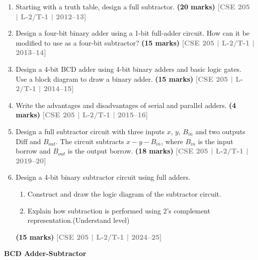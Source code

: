 \documentclass[12pt,a4paper]{article}
\newcommand{\yr}[1]{\hfill\textcolor{gray}{\small\textbf{[#1]}}}
\newcommand{\mk}[1]{\textcolor{orange!70!black}{\small\textbf{(#1 marks)}}}
\newcommand{\subtopic}[2]{%
  \vspace{10pt}
  \noindent\begin{tcolorbox}[colback=#1!8,colframe=#1,boxrule=0.6pt,arc=4pt,
    left=6pt,right=6pt,top=4pt,bottom=4pt]
    \small\bfseries\textcolor{#1}{#2}
  \end{tcolorbox}
  \vspace{2pt}
}
\begin{document}
\begin{enumerate}

\item Starting with a truth table, design a full subtractor.
\mk{20} \yr{CSE 205 | L-2/T-1 | 2012--13}

\item Design a four-bit binary adder using a 1-bit full-adder circuit. How can it be modified to use as a four-bit subtractor?
\mk{15} \yr{CSE 205 | L-2/T-1 | 2013--14}


\item Design a 4-bit BCD adder using 4-bit binary adders and basic logic gates. Use a block diagram to draw a binary adder.
\mk{15} \yr{CSE 205 | L-2/T-1 | 2014--15}


\item Write the advantages and disadvantages of serial and parallel adders.
\mk{4} \yr{CSE 205 | L-2/T-1 | 2015--16}


\item Design a full subtractor circuit with three inputs $x$, $y$, $B_{in}$ and two outputs $\mathrm{Diff}$ and $B_{out}$. The circuit subtracts $x - y - B_{in}$, where $B_{in}$ is the input borrow and $B_{out}$ is the output borrow.
\mk{18} \yr{CSE 205 | L-2/T-1 | 2019--20}

\item Design a 4-bit binary subtractor circuit using full adders.
\begin{enumerate}
  \item Construct and draw the logic diagram of the subtractor circuit.
  \item Explain how subtraction is performed using 2's complement representation.(Understand level)
\end{enumerate}
\mk{15} \yr{CSE 205 | L-2/T-1 | 2024--25}

\end{enumerate}

\subtopic{cD}{BCD Adder-Subtractor}
\label{sub:s4-bcd-addsub}
\end{document}
